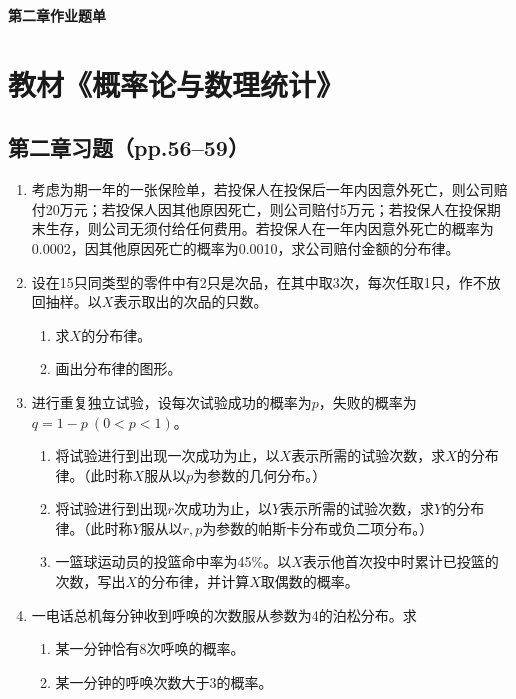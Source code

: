 \documentclass[UTF8]{ctexart}
\begin{document}
\begin{center}
\LARGE\bfseries 第二章作业题单
\end{center}

\section*{教材《概率论与数理统计》}

\subsection*{第二章习题（pp.56--59）}

\begin{enumerate}
\renewcommand{\labelenumi}{\textbf{\arabic{enumi}.}}
\item 考虑为期一年的一张保险单，若投保人在投保后一年内因意外死亡，则公司赔付20万元；若投保人因其他原因死亡，则公司赔付5万元；若投保人在投保期末生存，则公司无须付给任何费用。若投保人在一年内因意外死亡的概率为0.0002，因其他原因死亡的概率为0.0010，求公司赔付金额的分布律。

\setcounter{enumi}{2}
\item 设在15只同类型的零件中有2只是次品，在其中取3次，每次任取1只，作不放回抽样。以$X$表示取出的次品的只数。
\begin{enumerate}
\item[(1)] 求$X$的分布律。
\item[(2)] 画出分布律的图形。
\end{enumerate}

\item 进行重复独立试验，设每次试验成功的概率为$p$，失败的概率为$q=1-p\ (0<p<1)$。
\begin{enumerate}
\item[(1)] 将试验进行到出现一次成功为止，以$X$表示所需的试验次数，求$X$的分布律。（此时称$X$服从以$p$为参数的几何分布。）
\item[(2)] 将试验进行到出现$r$次成功为止，以$Y$表示所需的试验次数，求$Y$的分布律。（此时称$Y$服从以$r,p$为参数的帕斯卡分布或负二项分布。）
\item[(3)] 一篮球运动员的投篮命中率为45\%。以$X$表示他首次投中时累计已投篮的次数，写出$X$的分布律，并计算$X$取偶数的概率。
\end{enumerate}

\setcounter{enumi}{11}
\item 一电话总机每分钟收到呼唤的次数服从参数为4的泊松分布。求
\begin{enumerate}
\item[(1)] 某一分钟恰有8次呼唤的概率。
\item[(2)] 某一分钟的呼唤次数大于3的概率。
\end{enumerate}


\end{enumerate}
\end{document}
